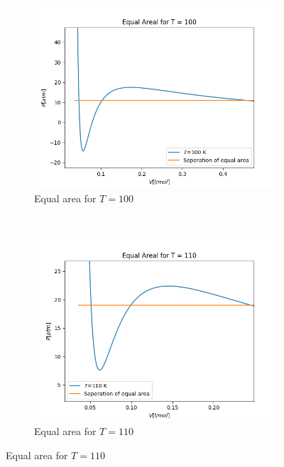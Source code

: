 \documentclass[a4paper,norsk, 10pt]{article}
\begin{document}
\begin{figure}[H]
    \centering
    \begin{subfigure}[b]{0.3\textwidth}
        \includegraphics[width=\textwidth]{T100.png}
        \caption{Equal area for $T=100$}
        \label{fig:gull}
    \end{subfigure}
    ~ 
    \begin{subfigure}[b]{0.3\textwidth}
        \includegraphics[width=\textwidth]{T110.png}
        \caption{Equal area for $T=110$}
        \label{fig:tiger}
    \end{subfigure}
\end{figure}
\end{document}
